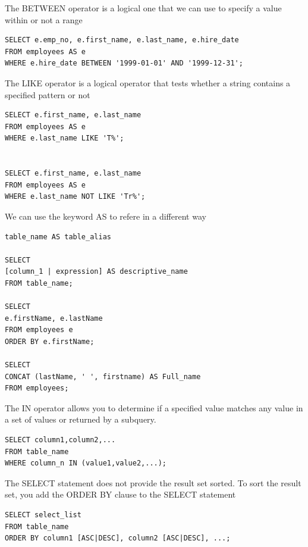\vspace{10pt}

The BETWEEN operator is a logical one that we can use to specify a value within or not a range

\begin{verbatim}
SELECT e.emp_no, e.first_name, e.last_name, e.hire_date
FROM employees AS e
WHERE e.hire_date BETWEEN '1999-01-01' AND '1999-12-31';
\end{verbatim}

\vspace{10pt}

The LIKE operator is a logical operator that tests whether a string
contains a specified pattern or not

\begin{verbatim}
SELECT e.first_name, e.last_name
FROM employees AS e
WHERE e.last_name LIKE 'T%';


SELECT e.first_name, e.last_name
FROM employees AS e
WHERE e.last_name NOT LIKE 'Tr%';
\end{verbatim}

We can use the keyword AS to refere in a different way

\begin{verbatim}
table_name AS table_alias

SELECT
[column_1 | expression] AS descriptive_name
FROM table_name;

SELECT
e.firstName, e.lastName
FROM employees e
ORDER BY e.firstName;

SELECT
CONCAT (lastName, ' ', firstname) AS Full_name
FROM employees;

\end{verbatim}

The IN operator allows you to determine if a specified value matches
any value in a set of values or returned by a subquery.

\begin{verbatim}
SELECT column1,column2,...
FROM table_name
WHERE column_n IN (value1,value2,...);
\end{verbatim}

The SELECT statement does not provide the result set sorted.
To sort the result set, you add the ORDER BY clause to the SELECT statement

\begin{verbatim}
SELECT select_list
FROM table_name
ORDER BY column1 [ASC|DESC], column2 [ASC|DESC], ...;

\end{verbatim}

